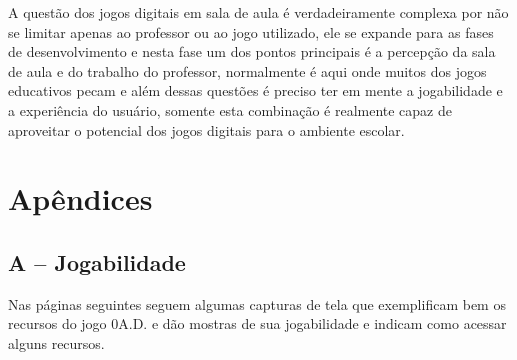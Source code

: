 \documentclass[article,11pt, a4paper,sumario=tradicional]{abntex2}
\begin{document}
    A questão dos jogos digitais em sala de aula é verdadeiramente complexa por não se limitar apenas ao professor ou ao jogo utilizado, ele se expande para as fases de desenvolvimento e nesta fase um dos pontos principais é a percepção da sala de aula e do trabalho do professor, normalmente é aqui onde muitos dos jogos educativos pecam e além dessas questões é preciso ter em mente a jogabilidade e a experiência do usuário, somente esta combinação é realmente capaz de aproveitar o potencial dos jogos digitais para o ambiente escolar.
    
\newpage

\section*{Apêndices}

	\subsection*{\textbf{A} -- Jogabilidade}
		Nas páginas seguintes seguem algumas capturas de tela que exemplificam bem os recursos do jogo 0A.D. e dão mostras de sua jogabilidade e indicam como acessar alguns recursos.
	
\end{document}
